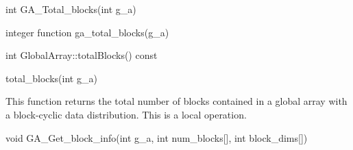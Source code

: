 \documentclass[12pt]{article}
\begin{document}

\begin{capi}
\begin{ccode}
int GA_Total_blocks(int g_a)
\end{ccode}
\begin{funcargs}
\end{funcargs}
\end{capi}

\begin{fapi}
\begin{fcode}
integer function ga_total_blocks(g_a)
\end{fcode}
\begin{funcargs}
\end{funcargs}
\end{fapi}

\begin{cxxapi}
\begin{cxxcode}
int GlobalArray::totalBlocks() const
\end{cxxcode}
\end{cxxapi}

\begin{pyapi}
\begin{pycode}
total_blocks(int g_a)
\end{pycode}
\end{pyapi}

\begin{desc}

This function returns the total number of blocks contained in a global array
with a block-cyclic data distribution. This is a local operation.

\end{desc}


\begin{capi}
\begin{ccode}
void GA_Get_block_info(int g_a, int num_blocks[], int block_dims[])
\end{ccode}
\begin{funcargs}
\end{funcargs}
\end{capi}
\end{document}
